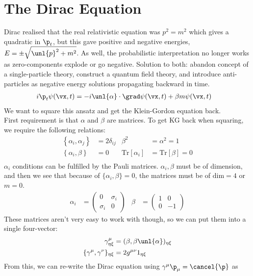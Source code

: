 \documentclass[a4paper, 11pt, normalem]{report}
\begin{document}
\section{The Dirac Equation}
Dirac realised that the real relativistic equation was $p^2 = m^2$ which gives a quadratic in $\p_t$, but this gave positive and negative energies, $E = \pm\sqrt{\unl{p}^2+m^2}$.
As well, the probabilistic interpretation no longer works as zero-components explode or go negative.
Solution to both: abandon concept of a single-particle theory, construct a quantum field theory, and introduce anti-particles as negative energy solutions propagating backward in time.
\begin{align}
    i\p_t\psi(\vx,t) &= -i\unl{\alpha}\cdot\grad\psi(\vx,t) + \beta m\psi(\vx,t)
\end{align}
We want to square this ansatz and get the Klein-Gordon equation back. \\
First requirement is that $\alpha$ and $\beta$ are matrices. 
To get KG back when squaring, we require the following relations:
\begin{align}
    \left\{\alpha_i,\alpha_j\right\} &= 2\delta_{ij} & \beta^2 &= \alpha^2 = 1 \\
    \left\{\alpha_i,\beta\right\} &= 0 & \text{Tr}[\alpha_i] &= \text{Tr}[\beta] = 0 \\
\end{align}
$\alpha_i$ conditions can be fulfilled by the Pauli matrices. 
$\alpha_i,\beta$ must be of  dimension, and then we see that because of $\{\alpha_i,\beta\} = 0$, the matrices must be of $\text{dim} = 4$ or $m=0$.
\begin{align}
    \alpha_i &= \begin{pmatrix} 0 & \sigma_i \\ \sigma_i & 0\end{pmatrix} & \beta &= \begin{pmatrix}1 & 0\\ 0& -1\end{pmatrix} 
\end{align}
These matrices aren't very easy to work with though, so we can put them into a single four-vector:
\begin{align}
    \gamma^\mu_{\eta\xi} &= (\beta,\beta\unl{\alpha})_{\eta\xi} \\
    \{\gamma^\mu,\gamma^\nu\}_{\eta\xi} &= 2g^{\mu\nu}1_{\eta\xi}
\end{align}
From this, we can re-write the Dirac equation using $\gamma^\mu\p_\mu = \cancel{\p}$ as
\end{document}
